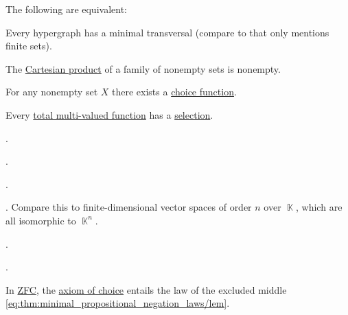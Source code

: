\begin{theorem}\label{thm:axiom_of_choice_equivalences}
  The following are equivalent:

  \begin{thmenum}
    Every hypergraph has a minimal transversal (compare to  that only mentions finite sets).

    The \hyperref[def:cartesian_product]{Cartesian product} of a family of nonempty sets is nonempty.

    \medskip

    For any nonempty set \( X \) there exists a \hyperref[def:choice_function]{choice function}.

    \medskip

     Every \hyperref[def:multi_valued_function/total]{total multi-valued function} has a \hyperref[def:function/selection]{selection}.

     .

     .

     .

     . Compare this to finite-dimensional vector spaces of order \( n \) over \( \BbbK \), which are all isomorphic to \( \BbbK^n \).

     .

     .
  \end{thmenum}
\end{theorem}

\begin{theorem}\label{diaconescu_goodman_myhill_theorem}
  In \hyperref[def:set]{ZFC}, the \hyperref[def:zfc/A9]{axiom of choice} entails the law of the excluded middle \eqref{eq:thm:minimal_propositional_negation_laws/lem}.
\end{theorem}
